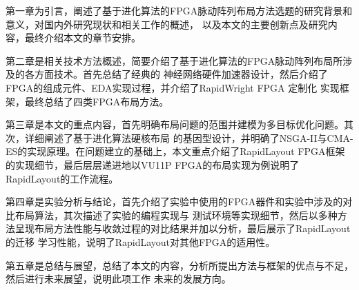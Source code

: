 第一章为引言，阐述了基于进化算法的FPGA脉动阵列布局方法选题的研究背景和意义，对国内外研究现状和相关工作的概述，
以及本文的主要创新点及研究内容，最终介绍本文的章节安排。


第二章是相关技术方法概述，简要介绍了基于进化算法的FPGA脉动阵列布局所涉及的各方面技术。首先总结了经典的
神经网络硬件加速器设计，然后介绍了FPGA的组成元件、EDA实现过程，并介绍了RapidWright FPGA 定制化
实现框架，最终总结了四类FPGA布局方法。

第三章是本文的重点内容，首先明确布局问题的范围并建模为多目标优化问题。其次，详细阐述了基于进化算法硬核布局
的基因型设计，并明确了NSGA-II与CMA-ES的实现原理。在问题建立的基础上，本文重点介绍了RapidLayout FPGA框架
的实现细节，最后层层递进地以VU11P FPGA的布局实现为例说明了RapidLayout的工作流程。

第四章是实验分析与结论，首先介绍了实验中使用的FPGA器件和实验中涉及的对比布局算法，其次描述了实验的编程实现与
测试环境等实现细节，然后以多种方法呈现布局方法性能与收敛过程的对比结果并加以分析，最后展示了RapidLayout的迁移
学习性能，说明了RapidLayout对其他FPGA的适用性。

第五章是总结与展望，总结了本文的内容，分析所提出方法与框架的优点与不足，然后进行未来展望，说明此项工作
未来的发展方向。


